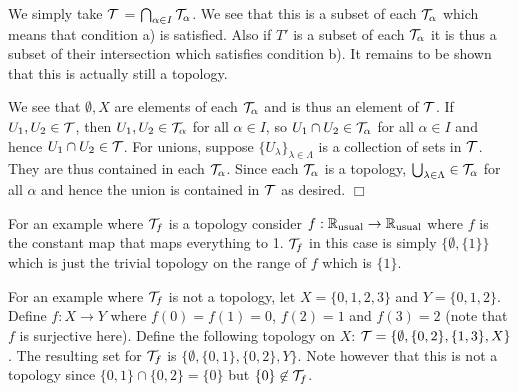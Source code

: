 \documentclass{article}
\begin{document}
 {
    We simply take $\mathcal{T}$ = $\bigcap_{\alpha\in I} \mathcal{T}_{\alpha}$. We see that this is a subset of each $\mathcal{T}_{\alpha}$ which means that condition a) is satisfied. Also if $T'$ is a subset of each $\mathcal{T}_{\alpha}$ it is thus a subset of their intersection which satisfies condition b). It remains to be shown that this is actually still a topology.

    We see that $\emptyset, X$ are elements of each $\mathcal{T}_{\alpha}$ and is thus an element of $\mathcal{T}$. If $U_{1},U_{2}\in \mathcal{T}$, then $U_{1},U_{2}\in \mathcal{T}_{\alpha}$ for all $\alpha\in I$, so $U_{1}\cap U_{2}\in \mathcal{T}_{\alpha}$ for all $\alpha\in I$ and hence $U_{1}\cap U_{2}\in \mathcal{T}$. For unions, suppose $\{U_{\lambda}\}_{\lambda\in \Lambda}$ is a collection of sets in $\mathcal{T}$. They are thus contained in each $\mathcal{T}_{\alpha}$. Since each $\mathcal{T}_{\alpha}$ is a topology, $\bigcup_{\lambda\in\Lambda}\in \mathcal{T}_{\alpha}$ for all $\alpha$ and hence the union is contained in $\mathcal{T}$ as desired. $\Box$
}

 {
    For an example where $\mathcal{T}_{f}$ is a topology consider $f: \mathbb{R}_{\text{usual}}\to \mathbb{R}_{\text{usual}}$ where $f$ is the constant map that maps everything to 1. $\mathcal{T}_{f}$ in this case is simply $\{\emptyset, \{1\}\}$ which is just the trivial topology on the range of $f$ which is $\{1\}$.

    For an example where $\mathcal{T}_{f}$ is not a topology, let $X = \{0,1,2,3\}$ and $Y = \{0,1,2\}$. Define $f:X\to Y$ where $f(0) = f(1) = 0$, $f(2) = 1$ and $f(3) = 2$ (note that $f$ is surjective here). Define the following topology on $X$: $\mathcal{T} = \{\emptyset, \{0,2\}, \{1,3\}, X\}$. The resulting set for $\mathcal{T}_{f}$ is $\{\emptyset, \{0,1\}, \{0,2\}, Y\}$. Note however that this is not a topology since $\{0,1\}\cap \{0,2\} = \{0\}$ but $\{0\}\not\in \mathcal{T}_{f}$.
}
\end{document}
